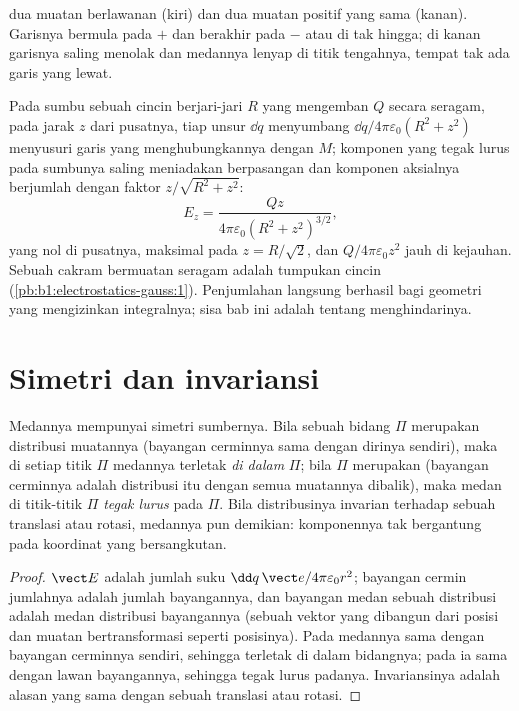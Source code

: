 \begin{omfigure}
{\small {} dua muatan berlawanan (kiri) dan dua muatan positif
yang sama (kanan). Garisnya bermula pada $+$ dan berakhir pada $-$ atau di
tak hingga; di kanan garisnya saling menolak dan medannya lenyap di
titik tengahnya, tempat tak ada garis yang lewat.}
\end{omfigure}

\begin{example}\label{ex:b1:electrostatics-gauss:ring}
Pada sumbu sebuah cincin berjari-jari $R$ yang mengemban $Q$ secara seragam, pada jarak
$z$ dari pusatnya, tiap unsur $\dd q$ menyumbang $\dd q/4\pi\varepsilon_0(R^2 +
z^2)$ menyusuri garis yang menghubungkannya dengan $M$; komponen yang tegak lurus
pada sumbunya saling meniadakan berpasangan dan komponen aksialnya berjumlah dengan faktor
$z/\sqrt{R^2 + z^2}$:
\[
E_z = \frac{Qz}{4\pi\varepsilon_0(R^2 + z^2)^{3/2}} ,
\]
yang nol di pusatnya, maksimal pada $z = R/\sqrt2$, dan $Q/4\pi\varepsilon_0z^2$ jauh
di kejauhan. Sebuah cakram bermuatan seragam adalah tumpukan cincin (\cref{pb:b1:electrostatics-gauss:1}).
Penjumlahan langsung berhasil bagi geometri yang mengizinkan integralnya;
sisa bab ini adalah tentang menghindarinya.
\end{example}

\section{Simetri dan invariansi}

\begin{proposition}\label{prop:b1:electrostatics-gauss:symmetry}
Medannya mempunyai simetri sumbernya. Bila sebuah bidang $\Pi$ merupakan
\emph{} distribusi muatannya (bayangan cerminnya
sama dengan dirinya sendiri), maka di setiap titik $\Pi$ medannya
terletak \emph{di dalam} $\Pi$; bila $\Pi$ merupakan \emph{}
(bayangan cerminnya adalah distribusi itu dengan semua muatannya dibalik), maka
medan di titik-titik $\Pi$ \emph{tegak lurus} pada $\Pi$. Bila
distribusinya invarian terhadap sebuah translasi atau rotasi, medannya pun
demikian: komponennya tak bergantung pada koordinat yang bersangkutan.
\end{proposition}

\begin{proof}
$\vect E$ adalah jumlah suku $\dd q\,\vect e/4\pi\varepsilon_0r^2$; bayangan cermin
jumlahnya adalah jumlah bayangannya, dan bayangan medan
sebuah distribusi adalah medan distribusi bayangannya (sebuah vektor
yang dibangun dari posisi dan muatan bertransformasi seperti posisinya). Pada
 medannya sama dengan bayangan cerminnya sendiri, sehingga terletak di dalam
bidangnya; pada  ia sama dengan lawan bayangannya,
sehingga tegak lurus padanya. Invariansinya adalah alasan yang sama dengan sebuah
translasi atau rotasi.
\end{proof}

